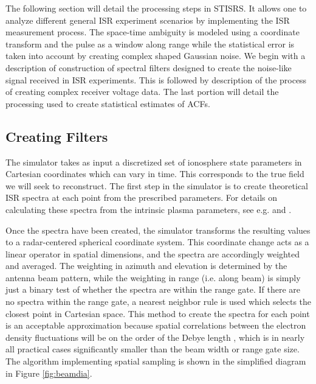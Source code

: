 \documentclass[draft,ras]{agutex}
\begin{document}
\begin{article}
The following section will detail the processing steps in STISRS. It allows one to analyze different general ISR experiment scenarios by implementing the ISR measurement process. The space-time ambiguity is modeled using a coordinate transform and the pulse as a window along range while the statistical error is taken into account by creating complex shaped Gaussian noise.  We begin with a description of construction of spectral filters designed to create the noise-like signal received in ISR experiments. This is followed by description of the process of creating complex receiver voltage data. The last portion will detail the processing used to create statistical estimates of ACFs.

\subsection{Creating Filters}

The simulator takes as input a discretized set of ionosphere state parameters in Cartesian coordinates which can vary in time.  This corresponds to the true field we will seek to reconstruct. The first step in the simulator is to create theoretical ISR spectra at each point from the prescribed parameters. For details on calculating these spectra from the intrinsic plasma parameters, see e.g. \citet{kudeki:milla:1} and \citet{kudeki:milla:2}. 

Once the spectra have been created, the simulator transforms the resulting values to a radar-centered spherical coordinate system. This coordinate change acts as a linear operator in spatial dimensions, and the spectra are accordingly weighted and averaged. The weighting in azimuth and elevation is determined by the antenna beam pattern, while the weighting in range (i.e. along beam) is simply just a binary test of whether the spectra are within the range gate. If there are no spectra within the range gate, a nearest neighbor rule is used which selects the closest point in Cartesian space. This method to create the spectra for each point is an acceptable approximation because spatial correlations between the electron density fluctuations will be on the order of the Debye length \citep{farley1969}, which is in nearly all practical cases significantly smaller than the beam width or range gate size. The algorithm implementing spatial sampling is shown in the simplified diagram in Figure \ref{fig:beamdia}.


\end{article}
\end{document}
